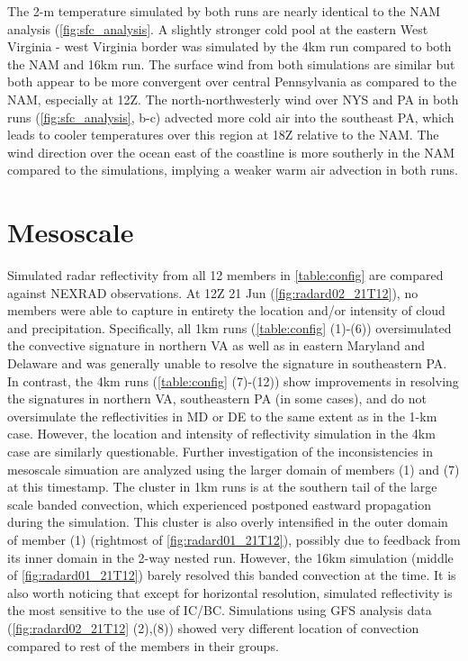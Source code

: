 The 2-m temperature simulated by both runs are nearly identical to the NAM analysis (\ref{fig:sfc_analysis}. A slightly stronger cold pool at the eastern West Virginia - west Virginia border was simulated by the 4km run compared to both the NAM and 16km run. The surface wind from both simulations are similar but both appear to be more convergent over central Pennsylvania as compared to the NAM, especially at 12Z. The north-northwesterly wind over NYS and PA in both runs (\ref{fig:sfc_analysis}, b-c) advected more cold air into the southeast PA, which leads to cooler temperatures over this region at 18Z relative to the NAM. The wind direction over the ocean east of the coastline is more southerly in the NAM compared to the simulations, implying a weaker warm air advection in both runs.
\section{Mesoscale}
Simulated radar reflectivity from all 12 members in \ref{table:config} are compared against NEXRAD observations. At 12Z 21 Jun (\ref{fig:radard02_21T12}), no members were able to capture in entirety the location and/or intensity of cloud and precipitation. Specifically, all 1km runs (\ref{table:config} (1)-(6)) oversimulated the convective signature in northern VA as well as in eastern Maryland and Delaware and was generally unable to resolve the signature in southeastern PA. In contrast, the 4km runs (\ref{table:config} (7)-(12)) show improvements in resolving the signatures in northern VA, southeastern PA (in some cases), and do not oversimulate the reflectivities in MD or DE to the same extent as in the 1-km case. However, the location and intensity of reflectivity simulation in the 4km case are similarly questionable. Further investigation of the inconsistencies in mesoscale simuation are analyzed using the larger domain of members (1) and (7) at this timestamp. The cluster in 1km runs is at the southern tail of the large scale banded convection, which experienced postponed eastward propagation  during the simulation. This cluster is also overly intensified in the outer domain of member (1) (rightmost of \ref{fig:radard01_21T12}), possibly due to feedback from its inner domain in the 2-way nested run. However, the 16km simulation (middle of \ref{fig:radard01_21T12}) barely resolved this banded convection at the time. It is also worth noticing that except for horizontal resolution, simulated reflectivity is the most sensitive to the use of IC/BC. Simulations using GFS analysis data (\ref{fig:radard02_21T12} (2),(8)) showed very different location of convection compared to rest of the members in their groups.

